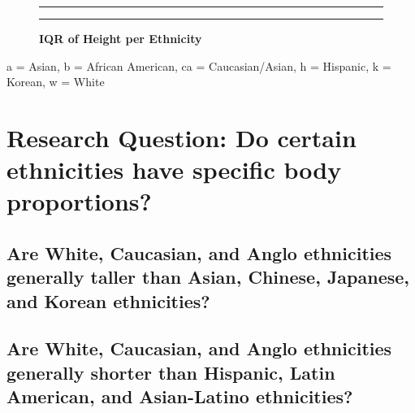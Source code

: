 \documentclass[]{article}
\begin{document}
\begin{figure}[!ht]
    \hrule
    \caption{ \textbf{IQR of Height per Ethnicity} }
    \begin{center}
    \end{center}
    \label{fig:TwoPlot}
    \hrule
\end{figure}

\newpage

a = Asian, b = African American, ca = Caucasian/Asian, h = Hispanic, k =
Korean, w = White

\section{Research Question:  Do certain ethnicities have specific body proportions?}
\label{sec:rq}

\subsection{Are White, Caucasian, and Anglo ethnicities generally taller than Asian, Chinese, Japanese, and Korean ethnicities?}
\label{sec:rq2}

\subsection{Are White, Caucasian, and Anglo ethnicities generally shorter than Hispanic, Latin American, and Asian-Latino ethnicities?}
\label{sec:rq3}
\end{document}
